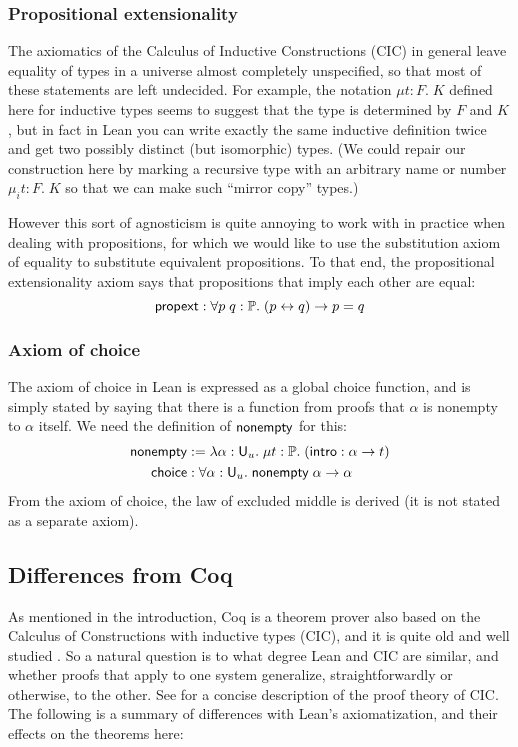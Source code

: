\subsubsection{Propositional extensionality}
The axiomatics of the Calculus of Inductive Constructions (CIC) in general leave equality of types in a universe almost completely unspecified, so that most of these statements are left undecided. For example, the notation $\mu t:F.\;K$ defined here for inductive types seems to suggest that the type is determined by $F$ and $K$, but in fact in Lean you can write exactly the same inductive definition twice and get two possibly distinct (but isomorphic) types. (We could repair our construction here by marking a recursive type with an arbitrary name or number $\mu_i t:F.\;K$ so that we can make such ``mirror copy'' types.)

However this sort of agnosticism is quite annoying to work with in practice when dealing with propositions, for which we would like to use the substitution axiom of equality to substitute equivalent propositions. To that end, the propositional extensionality axiom says that propositions that imply each other are equal:
$$\mathsf{propext}:\forall p\;q:\P.\;(p\leftrightarrow q)\to p=q$$

\subsubsection{Axiom of choice}
The axiom of choice in Lean is expressed as a global choice function, and is simply stated by saying that there is a function from proofs that $\alpha$ is nonempty to $\alpha$ itself. We need the definition of $\nonempty$ for this:
\begin{align*}
\nonempty&:=\lambda\alpha:\U_u.\;\mu t:\P.\;(\intro:\alpha\to t)\\
\mathsf{choice}&:\forall\alpha:\U_u.\;\nonempty\;\alpha\to\alpha
\end{align*}
From the axiom of choice, the law of excluded middle is derived (it is not stated as a separate axiom).

\subsection{Differences from \textsf{Coq}}\label{sec:notcoq}
As mentioned in the introduction, Coq is a theorem prover also based on the Calculus of Constructions with inductive types (CIC), and it is quite old and well studied \cite{barrassets, barrastypedec, coqincoq, coquandcoc, lee2011, ecc, notsosimple}. So a natural question is to what degree Lean and CIC are similar, and whether proofs that apply to one system generalize, straightforwardly or otherwise, to the other. See \cite{lee2011} for a concise description of the proof theory of CIC. The following is a summary of differences with Lean's axiomatization, and their effects on the theorems here:

